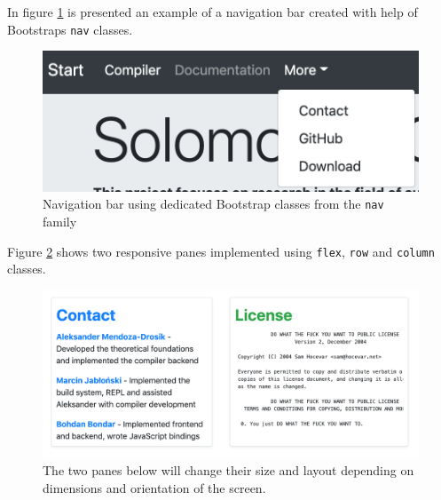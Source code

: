In figure \ref{navbar} is presented an example of a navigation bar created with help of Bootstraps \texttt{nav} classes.
\begin{figure}
	\centering
	
	\includegraphics[scale=0.7]{navbar.png}
	\caption{Navigation bar using dedicated Bootstrap classes from the \texttt{nav} family}
	\label{navbar}
\end{figure}
Figure \ref{panes} shows two responsive panes implemented using \texttt{flex}, \texttt{row} and \texttt{column} classes.
\begin{figure}
	\centering
	
	\includegraphics[scale=0.4]{panes.png}
	\caption{The two panes below will change their size and layout depending on dimensions and orientation of the screen.}
	\label{panes}
\end{figure}

